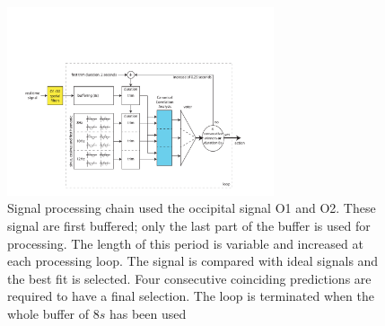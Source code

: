 \documentclass{svmult}
\begin{document}
\begin{figure}
\center
\includegraphics[width=0.7\textwidth]{figures/schema-openvibe-cca.pdf}
\caption{Signal processing chain used the occipital signal O1 and O2. These signal are first buffered; only the last part of the buffer is used for processing. The length of this period is variable and increased at each processing loop. The signal is compared with ideal signals and the best fit is selected. Four consecutive coinciding predictions are required to have a final selection. The loop is terminated when the whole buffer of 8$s$ has been used}
\label{fig:schema-openvibe-cca}
\end{figure}
\end{document}

